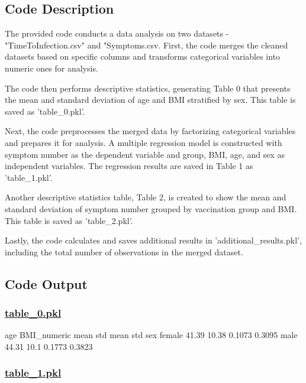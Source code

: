\documentclass[11pt]{article}
\begin{document}
\subsection{Code Description}

The provided code conducts a data analysis on two datasets - "TimeToInfection.csv" and "Symptoms.csv. First, the code merges the cleaned datasets based on specific columns and transforms categorical variables into numeric ones for analysis. 

The code then performs descriptive statistics, generating Table 0 that presents the mean and standard deviation of age and BMI stratified by sex. This table is saved as 'table\_0.pkl'.

Next, the code preprocesses the merged data by factorizing categorical variables and prepares it for analysis. A multiple regression model is constructed with symptom number as the dependent variable and group, BMI, age, and sex as independent variables. The regression results are saved in Table 1 as 'table\_1.pkl'.

Another descriptive statistics table, Table 2, is created to show the mean and standard deviation of symptom number grouped by vaccination group and BMI. This table is saved as 'table\_2.pkl'.

Lastly, the code calculates and saves additional results in 'additional\_results.pkl', including the total number of observations in the merged dataset.

\subsection{Code Output}\hypertarget{file-table-0-pkl}{}

\subsubsection*{\hyperlink{code-Data Analysis-table-0-pkl}{table\_0.pkl}}

\begin{codeoutput}
         age       BMI\_numeric       
        mean   std        mean    std
sex                                  
female 41.39 10.38      0.1073 0.3095
male   44.31  10.1      0.1773 0.3823
\end{codeoutput}\hypertarget{file-table-1-pkl}{}

\subsubsection*{\hyperlink{code-Data Analysis-table-1-pkl}{table\_1.pkl}}
\end{document}
